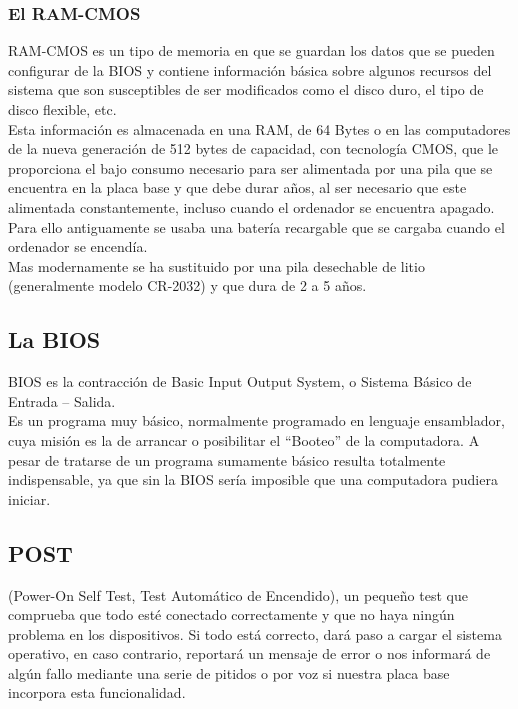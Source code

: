 		\subsubsection{El RAM-CMOS}\label{sub:el ram-cmos}

			RAM-CMOS es un tipo de memoria en que se guardan los datos que se
			pueden configurar de la BIOS y contiene información básica sobre algunos
			recursos del sistema que son susceptibles de ser modificados como el
			disco duro, el tipo de disco flexible, etc. \\
			Esta información es almacenada en una RAM, de 64 Bytes o en las
			computadores de la nueva generación de 512 bytes de capacidad, con
			tecnología CMOS, que le proporciona el bajo consumo necesario para
			ser alimentada por una pila que se encuentra en la placa base y que
			debe durar años, al ser necesario que este alimentada constantemente,
			incluso cuando el ordenador se encuentra apagado. Para ello
			antiguamente se usaba una batería recargable que se cargaba cuando el
			ordenador se encendía. \\
			Mas modernamente se ha sustituido por una pila desechable de litio
			(generalmente modelo CR-2032) y que dura de 2 a 5 años.

	\subsection{La BIOS}\label{sec:conceptobios}

		BIOS es la contracción de Basic Input Output System, o Sistema Básico de
		Entrada – Salida. \\
		Es un programa muy básico, normalmente programado en lenguaje ensamblador,
		cuya misión es la de arrancar o posibilitar el ``Booteo'' de la computadora.
		A pesar de tratarse de un programa sumamente básico resulta totalmente
		indispensable, ya que sin la BIOS sería imposible que una computadora pudiera
		iniciar.

	\subsection{POST}\label{sec:post}

		(Power-On Self Test, Test Automático de Encendido), un pequeño test que
		comprueba que todo esté conectado correctamente y que no haya ningún
		problema en los dispositivos. Si todo está correcto, dará paso a cargar
		el sistema operativo, en caso contrario, reportará un mensaje de
		error o nos informará de algún fallo mediante una serie de pitidos o
		por voz si nuestra placa base incorpora esta funcionalidad.

